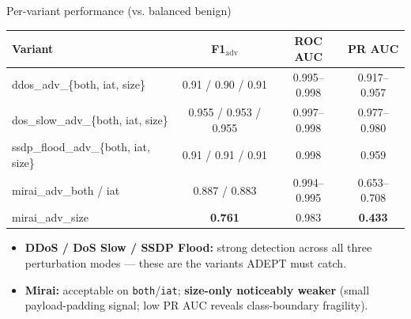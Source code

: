 \documentclass[10pt,aspectratio=169]{beamer}
\newcommand{\good}[1]{\textcolor{good}{\textbf{#1}}}
\newcommand{\warn}[1]{\textcolor{warn}{\textbf{#1}}}
\begin{document}
\begin{frame}{Per-variant performance (vs. balanced benign)}
\centering\small
\begin{tabular}{lccc}
\toprule
\textbf{Variant} & \textbf{F1$_\text{adv}$} & \textbf{ROC AUC} & \textbf{PR AUC} \\
\midrule
\rowcolor{good!15} ddos\_adv\_\{both, iat, size\}        & 0.91 / 0.90 / 0.91 & 0.995--0.998 & 0.917--0.957 \\
\rowcolor{good!15} dos\_slow\_adv\_\{both, iat, size\}   & 0.955 / 0.953 / 0.955 & 0.997--0.998 & 0.977--0.980 \\
\rowcolor{good!15} ssdp\_flood\_adv\_\{both, iat, size\} & 0.91 / 0.91 / 0.91 & 0.998        & 0.959 \\
\rowcolor{warn!15} mirai\_adv\_both / iat                & 0.887 / 0.883      & 0.994--0.995 & 0.653--0.708 \\
\rowcolor{warn!15} mirai\_adv\_size                      & \warn{0.761}       & 0.983        & \warn{0.433} \\
\bottomrule
\end{tabular}

\vspace{0.6em}
\begin{itemize}\small
  \item \good{DDoS / DoS Slow / SSDP Flood:} strong detection across all three perturbation
        modes --- these are the variants ADEPT must catch.
  \item \warn{Mirai:} acceptable on \texttt{both}/\texttt{iat}; \warn{size-only noticeably weaker}
        (small payload-padding signal; low PR AUC reveals class-boundary fragility).
\end{itemize}
\end{frame}
\end{document}
